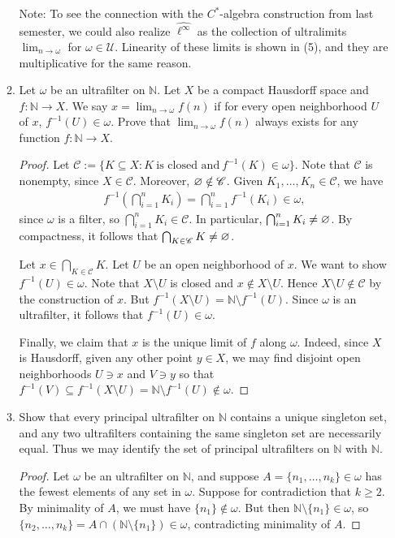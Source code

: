 \documentclass[a4paper,10pt]{report}
\newcommand{\N}{\mathbb{N}}
\begin{document}
\begin{enumerate}
\begin{enumerate}
				Note: To see the connection with the $C^*$-algebra construction from last semester,
				we could also realize $\widehat{\ell^{\infty}}$ as the collection of
				ultralimits $\lim_{n \to \omega}$ for $\omega \in \mathscr{U}$.
				Linearity of these limits is shown in (5), and they are multiplicative for the same reason.
			\item Let $\omega$ be an ultrafilter on $\N$.
				Let $X$ be a compact Hausdorff space and $f : \N \to X$.
				We say $x = \lim_{n \to \omega}{f(n)}$ if for every open neighborhood $U$
				of $x$, $f^{-1}(U) \in \omega$.
				Prove that $\lim_{n \to \omega}{f(n)}$ always exists for any function $f : \N \to X$.
				\begin{proof}
					Let $\mathscr{C} :=
					\{K \subseteq X : K~\text{is closed and}~f^{-1}(K) \in \omega\}$.
					Note that $\mathscr{C}$ is nonempty, since $X \in \mathscr{C}$.
					Moreover, $\varnothing \notin \mathscr{C}$.
					Given $K_1, \dots, K_n \in \mathscr{C}$, we have
					\begin{align*}
						f^{-1}\left( \bigcap_{i=1}^n{K_i} \right)
						 = \bigcap_{i=1}^n{f^{-1}(K_i)} \in \omega,
					\end{align*}
					since $\omega$ is a filter, so $\bigcap_{i=1}^n{K_i} \in \mathscr{C}$.
					In particular, $\bigcap_{i=1}^n{K_i} \ne \varnothing$.
					By compactness, it follows that $\bigcap_{K \in \mathscr{C}}{K} \ne \varnothing$.
					
					Let $x \in \bigcap_{K \in \mathscr{C}}{K}$.
					Let $U$ be an open neighborhood of $x$.
					We want to show $f^{-1}(U) \in \omega$.
					Note that $X \setminus U$ is closed and $x \notin X \setminus U$.
					Hence $X \setminus U \notin \mathscr{C}$ by the construction of $x$.
					But $f^{-1}(X \setminus U) = \N \setminus f^{-1}(U)$.
					Since $\omega$ is an ultrafilter, it follows that $f^{-1}(U) \in \omega$.
					
					Finally, we claim that $x$ is the unique limit of $f$ along $\omega$.
					Indeed, since $X$ is Hausdorff, given any other point $y \in X$,
					we may find disjoint open neighborhoods $U \ni x$ and $V \ni y$ so that
					$f^{-1}(V) \subseteq f^{-1}(X \setminus U) = \N \setminus f^{-1}(U) \notin \omega$.
				\end{proof}
			\item Show that every principal ultrafilter on $\N$ contains a unique singleton set,
				and any two ultrafilters containing the same singleton set are necessarily equal.
				Thus we may identify the set of principal ultrafilters on $\N$ with $\N$.
				\begin{proof}
					Let $\omega$ be an ultrafilter on $\N$,
					and suppose $A = \{n_1, \dots, n_k\} \in \omega$ has the fewest elements
					of any set in $\omega$.
					Suppose for contradiction that $k \ge 2$.
					By minimality of $A$, we must have $\{n_1\} \notin \omega$.
					But then $\N \setminus \{n_1\} \in \omega$, so
					$\{n_2, \dots, n_k\} = A \cap (\N \setminus \{n_1\}) \in \omega$,
					contradicting minimality of $A$.
					

\end{proof}
\end{enumerate}
\end{enumerate}
\end{document}
